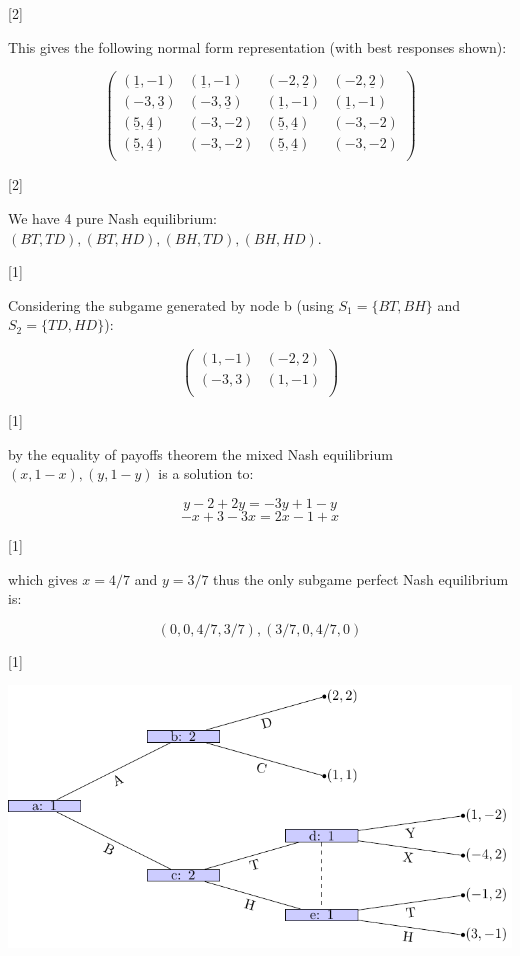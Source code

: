 \documentclass[12pt,a4paper]{article}
\begin{document}
\begin{enumerate}
\begin{enumerate}
                \hfill[2]

                This gives the following normal form representation (with best responses shown):

                \[\begin{pmatrix}
                (\underline{1},-1)&(\underline{1},-1)&(-2,\underline{2})&(-2,\underline{2})\\
                (-3,\underline{3})&(-3,\underline{3})&(\underline{1},-1)&(\underline{1},-1)\\
                (\underline{5},\underline{4})&(-3,-2)&(\underline{5},\underline{4})&(-3,-2)\\
                (\underline{5},\underline{4})&(-3,-2)&(\underline{5},\underline{4})&(-3,-2)\\
                \end{pmatrix}\]

                \hfill[2]

                We have 4 pure Nash equilibrium: \((BT,TD),(BT,HD),(BH,TD),(BH,HD)\).

                \hfill[1]

                Considering the subgame generated by node b (using \(S_1=\{BT,BH\}\) and \(S_2=\{TD,HD\}\)):

                \[
                \begin{pmatrix}
                (1,-1)&(-2,2)\\
                (-3,3)&(1,-1)\\
                \end{pmatrix}
                \]

                \hfill[1]

                by the equality of payoffs theorem the mixed Nash equilibrium \((x,1-x),(y,1-y)\) is a solution to:

                \[y-2+2y=-3y+1-y\]
                \[-x+3-3x=2x-1+x\]

                \hfill[1]

                which gives \(x=4/7\) and \(y=3/7\) thus the only subgame perfect Nash equilibrium is:

                \[(0,0,4/7,3/7),(3/7,0,4/7,0)\]

                \hfill[1]

                \begin{center}
                    \includegraphics[width=.8\textwidth]{images/mock-img03.pdf}
                \end{center}


\end{enumerate}
\end{enumerate}
\end{document}
